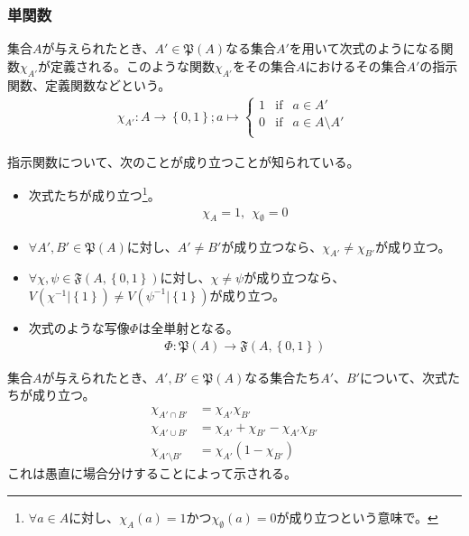 \documentclass[dvipdfmx]{jsarticle}
\begin{document}
\subsubsection{単関数}%
\begin{dfn}
集合$A$が与えられたとき、$A'\in \mathfrak{P}(A)$なる集合$A'$を用いて次式のようになる関数$\chi_{A'}$が定義される。このような関数$\chi_{A'}$をその集合$A$におけるその集合$A'$の指示関数、定義関数などという。
\begin{align*}
\chi_{A'}:A \rightarrow \left\{ 0,1 \right\};a \mapsto \left\{ \begin{matrix}
1 & \mathrm{if} & a \in A' \\
0 & \mathrm{if} & a \in A \setminus A' \\
\end{matrix} \right.\ 
\end{align*}
\end{dfn}
\begin{thm}\label{4.5.5.13}
  指示関数について、次のことが成り立つことが知られている。
  \begin{itemize}
  \item
    次式たちが成り立つ\footnote{$\forall a\in A$に対し、$\chi_{A} \left(a\right) =1$かつ$\chi_{\emptyset } \left(a\right) =0$が成り立つという意味で。}。
  \begin{align*}
  \chi_{A} = 1, \ \ \chi_{\emptyset} = 0
  \end{align*}
  \item
    $\forall A',B'\in \mathfrak{P}(A)$に対し、$A' \neq B' $が成り立つなら、$\chi_{A'} \neq \chi_{B'}$が成り立つ。
  \item
    $\forall\chi,\psi \in \mathfrak{F}\left( A,\left\{ 0,1 \right\} \right)$に対し、$\chi \neq \psi $が成り立つなら、$V\left( \chi^{- 1}|\left\{ 1 \right\} \right) \neq V\left( \psi^{- 1}|\left\{ 1 \right\} \right) $が成り立つ。
  \item
    次式のような写像$\varPhi$は全単射となる。
  \begin{align*}
    \varPhi:\mathfrak{P}(A)\mathfrak{\rightarrow F}\left( A,\left\{ 0,1 \right\} \right)
  \end{align*}
  \end{itemize}
\end{thm}
\begin{thm}\label{4.5.5.14}
集合$A$が与えられたとき、$A',B'\in \mathfrak{P}(A)$なる集合たち$A'$、$B'$について、次式たちが成り立つ。
\begin{align*}
\chi_{A' \cap B'} &= \chi_{A'}\chi_{B'}\\
\chi_{A' \cup B'} &= \chi_{A'} + \chi_{B'} - \chi_{A'}\chi_{B'}\\
\chi_{A' \setminus B'} &= \chi_{A'}\left( 1 - \chi_{B'} \right)
\end{align*}
これは愚直に場合分けすることによって示される。
\end{thm}
\end{document}
